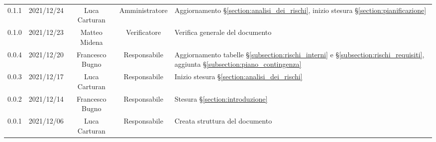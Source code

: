 \begin{center}
\begin{longtable}[c]{c | c | c | c | p{5cm}}
		0.1.1                                                      & 2021/12/24 & Luca Carturan        & Amministratore & Aggiornamento §\ref{section:analisi_dei_rischi}, inizio stesura §\ref{section:pianificazione}                                             \\
		0.1.0                                                      & 2021/12/23 & Matteo Midena        & Verificatore   & Verifica generale del documento                                                                                                           \\
		0.0.4                                                      & 2021/12/20 & Francesco Bugno      & Responsabile   & Aggiornamento tabelle §\ref{subsection:rischi_interni} e §\ref{subsection:rischi_requisiti}, aggiunta §\ref{subsection:piano_contingenza} \\
		0.0.3                                                      & 2021/12/17 & Luca Carturan        & Responsabile   & Inizio stesura §\ref{section:analisi_dei_rischi}                                                                                          \\
		0.0.2                                                      & 2021/12/14 & Francesco Bugno      & Responsabile   & Stesura §\ref{section:introduzione}                                                                                                       \\
		0.0.1                                                      & 2021/12/06 & Luca Carturan        & Responsabile   & Creata struttura del documento
	\end{longtable}
\end{center}